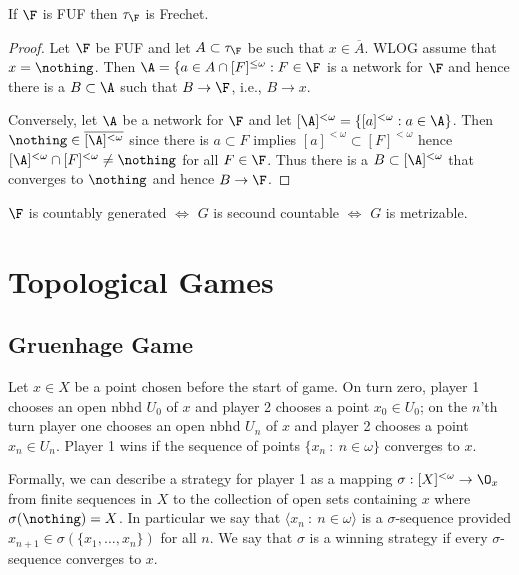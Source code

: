 \documentclass{article}
\begin{document}
\begin{prop}
    If \(\F\) is FUF then \(\tau_{\F}\) is Frechet.
\end{prop}
\begin{proof}
    Let \(\F\) be FUF and let \(A \subset \tau_{\F}\) be such that \(x \in \overline{A}\). WLOG assume that \(x = \nothing\). Then \(\A = \{a \in A \cap [F]^{\leq\omega}: F \in \F\) is a network for \(\F\) and hence there is a \(B \subset \A\) such that \(B \to \F\), i.e., \(B \to x\).

    Conversely, let \(\A\) be a network for \(\F\) and let \([\A]^{<\omega} = \{[a]^{<\omega}:a \in \A\}\). Then \(\nothing \in \overline{[\A]^{<\omega}}\) since there is \(a \subset F\) implies \([a]^{<\omega} \subset [F]^{<\omega}\) hence \([\A]^{<\omega}\cap [F]^{<\omega}\neq \nothing\) for all \(F \in \F\). Thus there is a \(B \subset [\A]^{<\omega} \) that converges to \(\nothing\) and hence \(B \to \F\).
\end{proof}
\begin{prop}
    \(\F\) is countably generated \(\iff\) \(G\) is secound countable \(\iff\) \(G\) is metrizable.
\end{prop}
\section{Topological Games}
\subsection{Gruenhage Game}

Let \(x \in X\) be a point chosen before the start of game. On turn zero, player 1 chooses an open nbhd \(U_0\) of \(x\) and player 2 chooses a point \(x_0 \in U_0\); on the \(n\)'th turn player one chooses an open nbhd \(U_n\) of \(x\) and player 2 chooses a point \(x_n \in U_n\). Player 1 wins if the sequence of points \(\{x_n \: : \: n \in \omega\}\) converges to \(x\).

Formally, we can describe a strategy for player 1 as a mapping \(\sigma: [X]^{<\omega} \to \O_x\) from finite sequences in \(X\) to the collection of open sets containing \(x\) where \(\sigma(\nothing) = X\). In particular we say that \(\langle x_n \: : \: n \in \omega\rangle\) is a \(\sigma\)-sequence provided \(x_{n + 1} \in \sigma(\{x_1, \dots, x_n\})\) for all \(n\). We say that \(\sigma\) is a winning strategy if every \(\sigma\)-sequence converges to \(x\).
\end{document}
